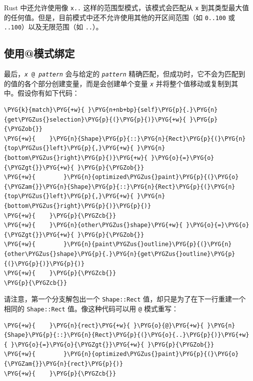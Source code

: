 Rust 中还允许使用像 \texttt{x..} 这样的范围型模式，该模式会匹配从 \texttt{x} 到其类型最大值的任何值。但是，目前模式中还不允许使用其他的开区间范围（如 \texttt{0..100} 或 \texttt{..100}）以及无限范围（如 \texttt{..}）。

\subsection{使用@模式绑定}

最后，\texttt{\emph{x} @ \emph{pattern}} 会与给定的 \emph{\texttt{pattern}} 精确匹配，但成功时，它不会为匹配到的值的各个部分创建变量，而是会创建单个变量 \emph{\texttt{x}} 并将整个值移动或复制到其中。假设你有如下代码：

\begin{Verbatim}[commandchars=\\\{\},breaklines=true,breakanywhere=true,fontsize=\codefont,xleftmargin=17bp]
\PYG{k}{match}\PYG{+w}{ }\PYG{n+nb+bp}{self}\PYG{p}{.}\PYG{n}{get\PYGZus{}selection}\PYG{p}{(}\PYG{p}{)}\PYG{+w}{ }\PYG{p}{\PYGZob{}}
\PYG{+w}{    }\PYG{n}{Shape}\PYG{p}{::}\PYG{n}{Rect}\PYG{p}{(}\PYG{n}{top\PYGZus{}left}\PYG{p}{,}\PYG{+w}{ }\PYG{n}{bottom\PYGZus{}right}\PYG{p}{)}\PYG{+w}{ }\PYG{o}{=}\PYG{o}{\PYGZgt{}}\PYG{+w}{ }\PYG{p}{\PYGZob{}}
\PYG{+w}{        }\PYG{n}{optimized\PYGZus{}paint}\PYG{p}{(}\PYG{o}{\PYGZam{}}\PYG{n}{Shape}\PYG{p}{::}\PYG{n}{Rect}\PYG{p}{(}\PYG{n}{top\PYGZus{}left}\PYG{p}{,}\PYG{+w}{ }\PYG{n}{bottom\PYGZus{}right}\PYG{p}{)}\PYG{p}{)}
\PYG{+w}{    }\PYG{p}{\PYGZcb{}}
\PYG{+w}{    }\PYG{n}{other\PYGZus{}shape}\PYG{+w}{ }\PYG{o}{=}\PYG{o}{\PYGZgt{}}\PYG{+w}{ }\PYG{p}{\PYGZob{}}
\PYG{+w}{        }\PYG{n}{paint\PYGZus{}outline}\PYG{p}{(}\PYG{n}{other\PYGZus{}shape}\PYG{p}{.}\PYG{n}{get\PYGZus{}outline}\PYG{p}{(}\PYG{p}{)}\PYG{p}{)}
\PYG{+w}{    }\PYG{p}{\PYGZcb{}}
\PYG{p}{\PYGZcb{}}
\end{Verbatim}

请注意，第一个分支解包出一个 \texttt{Shape::Rect} 值，却只是为了在下一行重建一个相同的 \texttt{Shape::Rect} 值。像这种代码可以用 \texttt{@} 模式重写：

\begin{Verbatim}[commandchars=\\\{\},breaklines=true,breakanywhere=true,fontsize=\codefont,xleftmargin=17bp]
\PYG{+w}{    }\PYG{n}{rect}\PYG{+w}{ }\PYG{o}{@}\PYG{+w}{ }\PYG{n}{Shape}\PYG{p}{::}\PYG{n}{Rect}\PYG{p}{(}\PYG{o}{..}\PYG{p}{)}\PYG{+w}{ }\PYG{o}{=}\PYG{o}{\PYGZgt{}}\PYG{+w}{ }\PYG{p}{\PYGZob{}}
\PYG{+w}{        }\PYG{n}{optimized\PYGZus{}paint}\PYG{p}{(}\PYG{o}{\PYGZam{}}\PYG{n}{rect}\PYG{p}{)}
\PYG{+w}{    }\PYG{p}{\PYGZcb{}}
\end{Verbatim}

